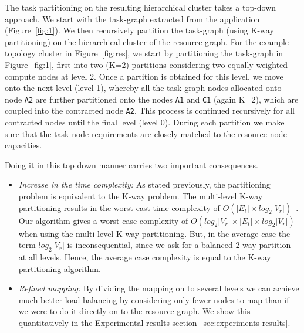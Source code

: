 The task partitioning on the resulting hierarchical cluster takes a
top-down approach. We start with the task-graph extracted from the
application (Figure~\ref{fig:1}). We then recursively partition the
task-graph (using K-way partitioning) on the hierarchical cluster of the
resource-graph. For the example topology cluster in
Figure~\ref{fig:res}, we start by partitioning the task-graph in
Figure~\ref{fig:1}, first into two (K=2) partitions considering two
equally weighted compute nodes at level 2. Once a partition is obtained
for this level, we move onto the next level (level 1), whereby all the
task-graph nodes allocated onto node \texttt{A2} are further partitioned
onto the nodes \texttt{A1} and \texttt{C1} (again K=2), which are
coupled into the contracted node \texttt{A2}. This process is continued
recursively for all contracted nodes until the final level (level
0). During each partition we make sure that the task node requirements
are closely matched to the resource node capacities.


Doing it in this top down manner carries two important consequences.

\begin{itemize}

\item \textit{Increase in the time complexity:} As stated previously,
  the partitioning problem is equivalent to the K-way problem. The
  multi-level K-way partitioning results in the worst cast time
  complexity of $O(|E_t| \times log_2|V_r|)$~\cite{gkar98}. Our
  algorithm gives a worst case complexity of \mbox{$O(log_2|V_r| \times
    |E_t| \times log_2 |V_r|)$} when using the multi-level K-way
  partitioning. But, in the average case the term $log_2|V_r|$ is
  inconsequential, since we ask for a balanced 2-way partition at all
  levels. Hence, the average case complexity is equal to the K-way
  partitioning algorithm.

\item \textit{Refined mapping:} By dividing the mapping on to several
  levels we can achieve much better load balancing by considering only
  fewer nodes to map than if we were to do it directly on to the
  resource graph. We show this quantitatively in the Experimental
  results section~\ref{sec:experiments-results}.

\end{itemize}





